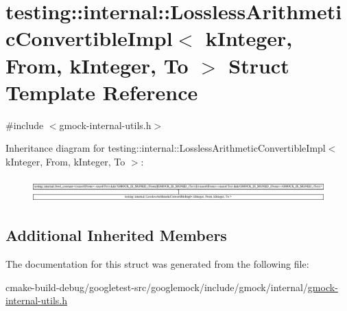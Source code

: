 \hypertarget{structtesting_1_1internal_1_1LosslessArithmeticConvertibleImpl_3_01kInteger_00_01From_00_01kInteger_00_01To_01_4}{}\section{testing\+::internal\+::Lossless\+Arithmetic\+Convertible\+Impl$<$ k\+Integer, From, k\+Integer, To $>$ Struct Template Reference}
\label{structtesting_1_1internal_1_1LosslessArithmeticConvertibleImpl_3_01kInteger_00_01From_00_01kInteger_00_01To_01_4}


{\ttfamily \#include $<$gmock-\/internal-\/utils.\+h$>$}

Inheritance diagram for testing\+::internal\+::Lossless\+Arithmetic\+Convertible\+Impl$<$ k\+Integer, From, k\+Integer, To $>$\+:\begin{figure}[H]
\begin{center}
\leavevmode
\includegraphics[height=0.918786cm]{structtesting_1_1internal_1_1LosslessArithmeticConvertibleImpl_3_01kInteger_00_01From_00_01kInteger_00_01To_01_4}
\end{center}
\end{figure}
\subsection*{Additional Inherited Members}


The documentation for this struct was generated from the following file\+:\begin{DoxyCompactItemize}
\item 
cmake-\/build-\/debug/googletest-\/src/googlemock/include/gmock/internal/\mbox{\hyperlink{gmock-internal-utils_8h}{gmock-\/internal-\/utils.\+h}}\end{DoxyCompactItemize}
